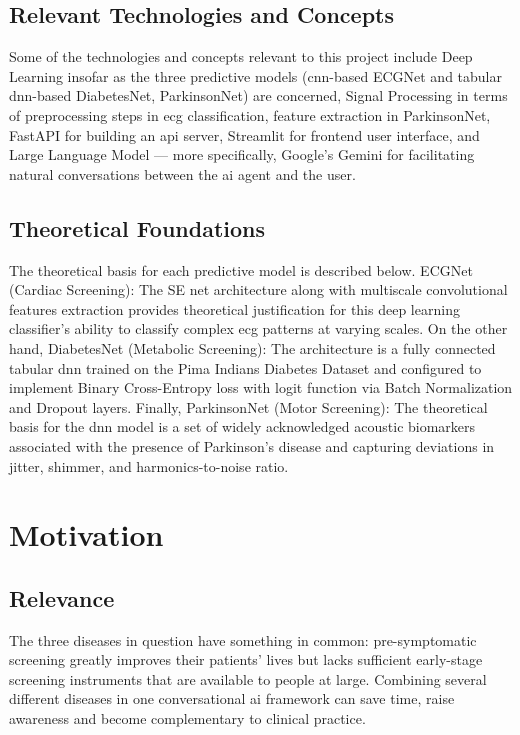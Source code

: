 \subsection{Relevant Technologies and Concepts}

Some of the technologies and concepts relevant to this project include Deep Learning insofar as the three predictive models (\acl{cnn}-based ECGNet and tabular \ac{dnn}-based DiabetesNet, ParkinsonNet) are concerned, Signal Processing in terms of preprocessing steps in \ac{ecg} classification, feature extraction in ParkinsonNet, FastAPI for building an \ac{api} server, Streamlit for frontend user interface, and Large Language Model --- more specifically, Google's Gemini for facilitating natural conversations between the \ac{ai} agent and the user.

\subsection{Theoretical Foundations}

The theoretical basis for each predictive model is described below. ECGNet (Cardiac Screening): The SE \ac{net} architecture along with multiscale convolutional features extraction provides theoretical justification for this deep learning classifier's ability to classify complex \ac{ecg} patterns at varying scales. On the other hand, DiabetesNet (Metabolic Screening): The architecture is a fully connected tabular \ac{dnn} trained on the Pima Indians Diabetes Dataset and configured to implement Binary Cross-Entropy loss with logit function via Batch Normalization and Dropout layers. Finally, ParkinsonNet (Motor Screening): The theoretical basis for the \ac{dnn} model is a set of widely acknowledged acoustic biomarkers associated with the presence of Parkinson's disease and capturing deviations in jitter, shimmer, and harmonics-to-noise ratio.

\section{Motivation}

\subsection{Relevance}

The three diseases in question have something in common: pre-symptomatic screening greatly improves their patients' lives but lacks sufficient early-stage screening instruments that are available to people at large. Combining several different diseases in one conversational \ac{ai} framework can save time, raise awareness and become complementary to clinical practice.


